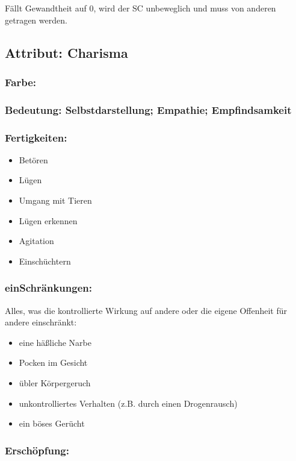 Fällt Gewandtheit auf 0, wird der SC unbeweglich und muss von anderen getragen werden.

\subsection{Attribut: Charisma}

\subsubsection{Farbe: \herz}

\subsubsection{Bedeutung: Selbstdarstellung; Empathie; Empfindsamkeit}

\subsubsection{Fertigkeiten:}
\begin{itemize}
\item Betören
\item Lügen
\item Umgang mit Tieren
\item Lügen erkennen
\item Agitation
\item Einschüchtern
\end{itemize}

\subsubsection{einSchränkungen:}

Alles, was die kontrollierte Wirkung auf andere oder die eigene Offenheit für andere einschränkt:
\begin{itemize}
\item eine häßliche Narbe
\item Pocken im Gesicht
\item übler Körpergeruch
\item unkontrolliertes Verhalten (z.B. durch einen Drogenrausch)
\item ein böses Gerücht
\end{itemize}

\subsubsection{Erschöpfung:}

